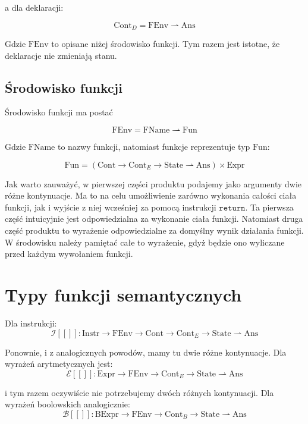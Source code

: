 \documentclass[a4paper]{article}
\begin{document}
a dla deklaracji:

$$
\text{Cont}_D = \text{FEnv} \rightharpoonup \text{Ans}
$$

Gdzie $\text{FEnv}$ to opisane niżej środowisko funkcji. Tym razem jest istotne, że deklaracje nie zmieniają stanu.

\subsection*{Środowisko funkcji}

Środowisko funkcji ma postać

$$
\text{FEnv} = \text{FName} \rightharpoonup \text{Fun}
$$

Gdzie $\text{FName}$ to nazwy funkcji, natomiast funkcje reprezentuje typ $\text{Fun}$:

$$
\text{Fun} = (\text{Cont} \longrightarrow \text{Cont}_E \longrightarrow \text{State} \rightharpoonup \text{Ans}) \times \text{Expr}
$$

Jak warto zauważyć, w pierwszej części produktu podajemy jako argumenty dwie różne kontynuacje. Ma to na celu umożliwienie zarówno wykonania całości ciała funkcji, jak i wyjście z niej wcześniej za pomocą instrukcji $\texttt{return}$. Ta pierwsza część intuicyjnie jest odpowiedzialna za wykonanie ciała funkcji. Natomiast druga część produktu to wyrażenie odpowiedzialne za domyślny wynik działania funkcji. W środowisku należy pamiętać całe to wyrażenie, gdyż będzie ono wyliczane przed każdym wywołaniem funkcji.


\section*{Typy funkcji semantycznych}

Dla instrukcji:
$$
\mathcal{I}[\![]\!]: \text{Instr} \longrightarrow \text{FEnv} \longrightarrow \text{Cont} \longrightarrow \text{Cont}_E \longrightarrow \text{State} \rightharpoonup \text{Ans}
$$

Ponownie, i z analogicznych powodów, mamy tu dwie różne kontynuacje. Dla wyrażeń arytmetycznych jest:
$$
\mathcal{E}[\![]\!]: \text{Expr} \longrightarrow \text{FEnv} \longrightarrow \text{Cont}_E \longrightarrow \text{State} \rightharpoonup \text{Ans}
$$

i tym razem oczywiście nie potrzebujemy dwóch różnych kontynuacji. Dla wyrażeń boolowskich analogicznie:
$$
\mathcal{B}[\![]\!]: \text{BExpr} \longrightarrow \text{FEnv} \longrightarrow \text{Cont}_B \longrightarrow \text{State} \rightharpoonup \text{Ans}
$$
\end{document}
